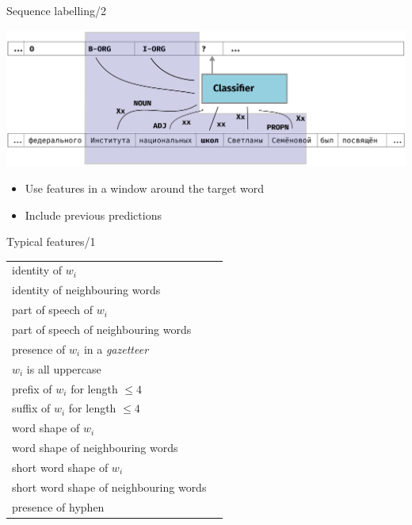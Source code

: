 \documentclass[10pt, compress]{beamer}
\begin{document}
\begin{frame}{Sequence labelling/2}
\begin{center}
  \includegraphics[width=\textwidth]{graphics/classifier.eps}
\end{center}
\begin{itemize}
  \item Use features in a window around the target word
  \item Include previous predictions 
\end{itemize} 
\end{frame}





\begin{frame}{Typical features/1}

\begin{tabular}{ll}
identity of $w_i$  &  \\
identity of neighbouring words  &  \\
part of speech of $w_i$  &  \\
part of speech of neighbouring words  &  \\
presence of $w_i$ in a \emph{gazetteer} &  \\
$w_i$ is all uppercase &  \\
prefix of $w_i$ for length $\le 4$ &  \\
suffix of $w_i$ for length $\le 4$ &  \\
word shape of $w_i$ &  \\
word shape of neighbouring words &  \\
short word shape of $w_i$ \\
short word shape of neighbouring words &  \\
presence of hyphen &  \\

\end{tabular}

\end{frame}
\end{document}
